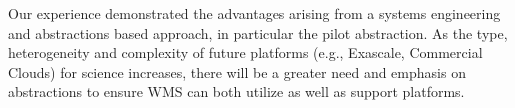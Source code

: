 Our experience demonstrated the advantages arising from a  systems engineering
and abstractions based approach, in particular the pilot abstraction. As the
type, heterogeneity and complexity of future platforms  (e.g., Exascale,
Commercial Clouds) for science increases, there will be a greater need and
emphasis on abstractions to ensure WMS can both utilize as well as support
platforms.







